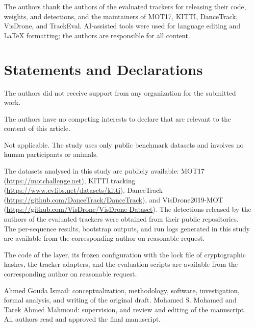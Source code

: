 \documentclass[pdflatex,sn-mathphys-num]{sn-jnl}
\begin{document}
\maketitle











\backmatter

The authors thank the authors of the evaluated trackers for releasing their code, weights, and
detections, and the maintainers of MOT17, KITTI, DanceTrack, VisDrone, and TrackEval.
AI-assisted tools were used for language editing and LaTeX formatting; the authors are
responsible for all content.

\section*{Statements and Declarations}

The authors did not receive support from any organization for the submitted work.

The authors have no competing interests to declare that are relevant to the content of this
article.

Not applicable. The study uses only public benchmark datasets and involves no human participants
or animals.

The datasets analysed in this study are publicly available: MOT17
(\url{https://motchallenge.net}), KITTI tracking (\url{https://www.cvlibs.net/datasets/kitti}),
DanceTrack (\url{https://github.com/DanceTrack/DanceTrack}), and VisDrone2019-MOT
(\url{https://github.com/VisDrone/VisDrone-Dataset}). The detections released by the authors of the
evaluated trackers were obtained from their public repositories. The per-sequence results,
bootstrap outputs, and run logs generated in this study are available from the corresponding author
on reasonable request.

The code of the layer, its frozen configuration with the lock file of cryptographic hashes, the
tracker adapters, and the evaluation scripts are available from the corresponding author on
reasonable request.

Ahmed Gouda Ismail: conceptualization, methodology, software, investigation, formal analysis, and
writing of the original draft. Mohamed S. Mohamed and Tarek Ahmed Mahmoud: supervision, and
review and editing of the manuscript. All authors read and approved the final manuscript.


\end{document}

